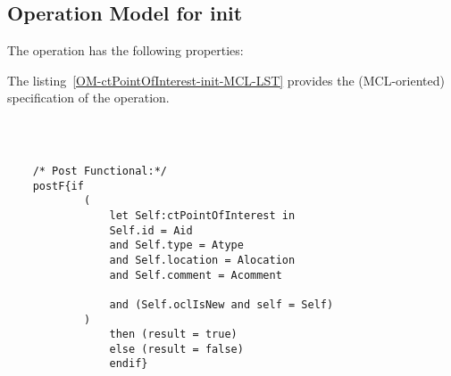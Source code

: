 \subsection{Operation Model for init}

\label{OM-init}


The  operation has the following properties:

	\begin{operationmodel}



		


	\end{operationmodel}



	\vspace{1cm}
	The listing~\ref{OM-ctPointOfInterest-init-MCL-LST} provides the \msrmessir (MCL-oriented) specification of the operation.
	
	\scriptsize
	\vspace{0.5cm}
	\begin{lstlisting}[style=MessirStyle,firstnumber=auto,captionpos=b,caption={\msrmessir (MCL-oriented) specification of the operation \emph{init}.},label=OM-ctPointOfInterest-init-MCL-LST]

	
	
	/* Post Functional:*/ 
	postF{if
			(
				let Self:ctPointOfInterest in
				Self.id = Aid
				and Self.type = Atype
				and Self.location = Alocation
				and Self.comment = Acomment
	
				and (Self.oclIsNew and self = Self)
			)
				then (result = true)
				else (result = false)
				endif}
	
	
	\end{lstlisting}
	\normalsize 
	
	
	
	






